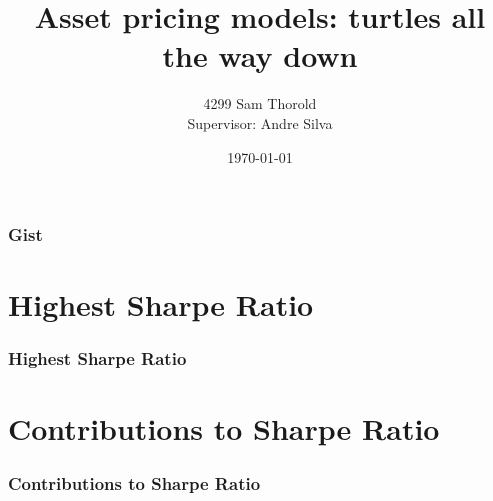 \documentclass{beamer}
\title[Turtles]{Asset pricing models: turtles all the way down}
\author[Thorold]{4299 Sam Thorold\\
                 Supervisor: Andre Silva}
\institute{NHH\\
           NOVA}
\date[April 2018]{\today}
\begin{document}
\frame{\titlepage}

\begin{frame}
\frametitle{Gist}
\tableofcontents
\end{frame}

\section{Highest Sharpe Ratio}
\begin{frame}
\frametitle{Highest Sharpe Ratio}
\resizebox{\linewidth}{!}{}
\end{frame}

\section{Contributions to Sharpe Ratio}
\begin{frame}
\frametitle{Contributions to Sharpe Ratio}
\resizebox*{!}{\dimexpr\textheight-1.1cm\relax}{}
\end{frame}
\end{document}
